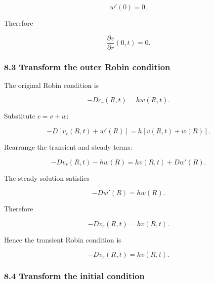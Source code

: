 \documentclass[11pt,a4paper]{article}
\begin{document}
\begin{equation}
w'(0)=0.
\tag{TRISO-ANA-218}
\label{eq:triso-ana-218}
\end{equation}

Therefore

\begin{equation}
\boxed{
\frac{\partial v}{\partial r}(0,t)=0.
}
\tag{TRISO-ANA-219}
\label{eq:triso-ana-219}
\end{equation}

\subsubsection*{8.3 Transform the outer Robin condition}

The original Robin condition is

\begin{equation}
-Dc_r(R,t)=hw(R,t).
\tag{TRISO-ANA-220}
\label{eq:triso-ana-220}
\end{equation}

Substitute $c=v+w$:

\begin{equation}
-D
\left[
v_r(R,t)+w'(R)
\right]
=
h
\left[
v(R,t)+w(R)
\right].
\tag{TRISO-ANA-221}
\label{eq:triso-ana-221}
\end{equation}

Rearrange the transient and steady terms:

\begin{equation}
-Dv_r(R,t)-hw(R)
=
hv(R,t)+Dw'(R).
\tag{TRISO-ANA-222}
\label{eq:triso-ana-222}
\end{equation}

The steady solution satisfies

\begin{equation}
-Dw'(R)=hw(R).
\tag{TRISO-ANA-223}
\label{eq:triso-ana-223}
\end{equation}

Therefore

\begin{equation}
-Dv_r(R,t)=hv(R,t).
\tag{TRISO-ANA-224}
\label{eq:triso-ana-224}
\end{equation}

Hence the transient Robin condition is

\begin{equation}
\boxed{
-Dv_r(R,t)=hv(R,t).
}
\tag{TRISO-ANA-225}
\label{eq:triso-ana-225}
\end{equation}

\subsubsection*{8.4 Transform the initial condition}
\end{document}
